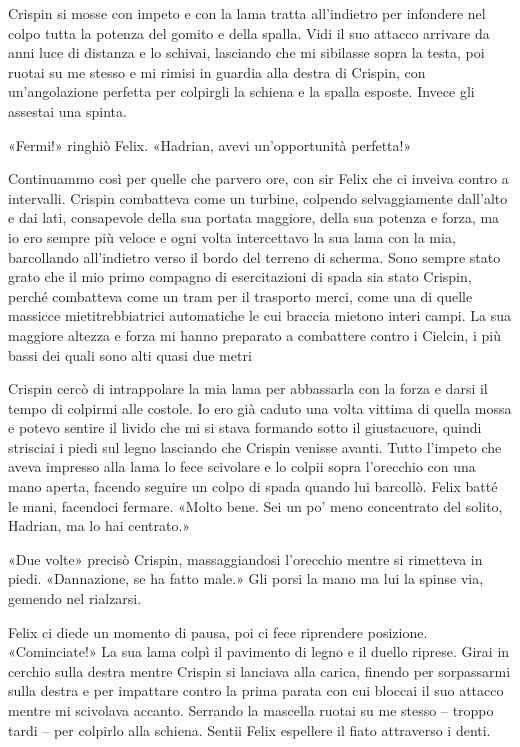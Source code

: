Crispin si mosse con impeto e con la lama tratta all'indietro per
infondere nel colpo tutta la potenza del gomito e della spalla. Vidi il
suo attacco arrivare da anni luce di distanza e lo schivai, lasciando
che mi sibilasse sopra la testa, poi ruotai su me stesso e mi rimisi in
guardia alla destra di Crispin, con un'angolazione perfetta per
colpirgli la schiena e la spalla esposte. Invece gli assestai una
spinta.

«Fermi!» ringhiò Felix. «Hadrian, avevi un'opportunità perfetta!»

Continuammo così per quelle che parvero ore, con sir Felix che ci
inveiva contro a intervalli. Crispin combatteva come un turbine,
colpendo selvaggiamente dall'alto e dai lati, consapevole della sua
portata maggiore, della sua potenza e forza, ma io ero sempre più veloce
e ogni volta intercettavo la sua lama con la mia, barcollando
all'indietro verso il bordo del terreno di scherma. Sono sempre stato
grato che il mio primo compagno di esercitazioni di spada sia stato
Crispin, perché combatteva come un tram per il trasporto merci, come una
di quelle massicce mietitrebbiatrici automatiche le cui braccia mietono
interi campi. La sua maggiore altezza e forza mi hanno preparato a
combattere contro i Cielcin, i più bassi dei quali sono alti quasi due
metri

Crispin cercò di intrappolare la mia lama per abbassarla con la forza e
darsi il tempo di colpirmi alle costole. Io ero già caduto una volta
vittima di quella mossa e potevo sentire il livido che mi si stava
formando sotto il giustacuore, quindi strisciai i piedi sul legno
lasciando che Crispin venisse avanti. Tutto l'impeto che aveva impresso
alla lama lo fece scivolare e lo colpii sopra l'orecchio con una mano
aperta, facendo seguire un colpo di spada quando lui barcollò. Felix
batté le mani, facendoci fermare. «Molto bene. Sei un po' meno
concentrato del solito, Hadrian, ma lo hai centrato.»

«Due volte» precisò Crispin, massaggiandosi l'orecchio mentre si
rimetteva in piedi. «Dannazione, se ha fatto male.» Gli porsi la mano ma
lui la spinse via, gemendo nel rialzarsi.

Felix ci diede un momento di pausa, poi ci fece riprendere posizione.
«Cominciate!» La sua lama colpì il pavimento di legno e il duello
riprese. Girai in cerchio sulla destra mentre Crispin si lanciava alla
carica, finendo per sorpassarmi sulla destra e per impattare contro la
prima parata con cui bloccai il suo attacco mentre mi scivolava accanto.
Serrando la mascella ruotai su me stesso -- troppo tardi -- per colpirlo
alla schiena. Sentii Felix espellere il fiato attraverso i denti.


